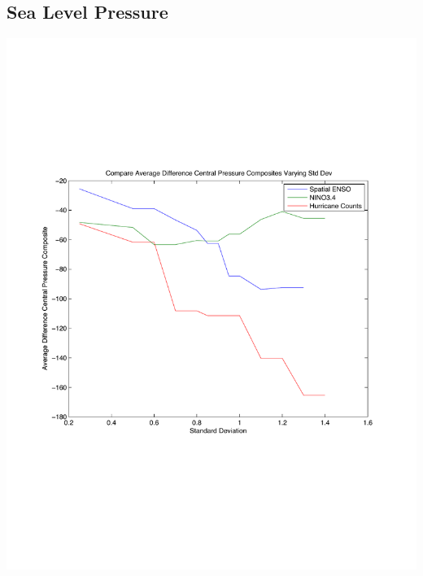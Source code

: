 \documentclass[11pt]{article}
\begin{document}
\subsection{Sea Level Pressure}
\includegraphics[scale = 0.6]{images/varyingStdDevForCompositesCentralPressure.pdf}
\end{document}
